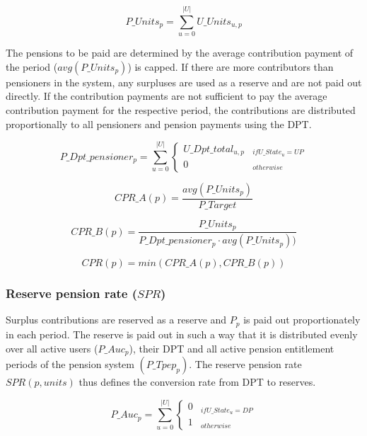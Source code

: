 \begin{equation}
P\_Units_{p} = \sum_{u=0}^{|U|} U\_Units_{u,p}
\end{equation}

The pensions to be paid are determined by the average contribution payment of the 
period ($avg(P\_Units_{p})$) is capped. If there are more contributors than pensioners in the system, any surpluses are used as a reserve and are not paid out directly. If the contribution payments are not sufficient to pay the average contribution payment for the respective period, the contributions are distributed proportionally to all pensioners and pension payments using the DPT.

\begin{dmath}
P\_Dpt\_pensioner_{p} = 
\sum_{u=0}^{|U|} \begin{cases} 
U\_Dpt\_total_{u,p} & _{if U\_State_{u} = UP}\\
0 & _{otherwise}
\end{cases}
\end{dmath}

\begin{equation*}
CPR\_A(p) = \frac{avg(P\_Units_{p})}{P\_Target}
\end{equation*}

\begin{equation*}
CPR\_B(p) = \frac{P\_Units_{p}} {P\_Dpt\_pensioner_{p} \cdot avg(P\_Units_{p}))}
\end{equation*}

\begin{equation}
CPR(p) = min(CPR\_A(p), CPR\_B(p))
\end{equation}


\subsubsection{Reserve pension rate ($SPR$)}

Surplus contributions are reserved as a reserve and $P_{p}$ is paid out proportionately in each period. The reserve is paid out in such a way that it is distributed evenly over all active users ($P\_Auc_{p}$), their DPT and all active pension entitlement periods of the pension system $(P\_Tpep_{p})$. The reserve pension rate $SPR(p, units)$ thus defines the conversion rate from DPT to reserves.


\begin{equation}
P\_Auc_{p} = \sum_{u=0}^{|U|} \begin{cases} 
0 & _{if U\_State_{u} = DP}\\
1 & _{otherwise}
\end{cases}
\end{equation}

